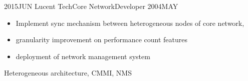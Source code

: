\begin{experiences}
	\emptySeparator
	\experience
	{2015JUN} {Lucent Tech}{Core Network}{Developer}
	{2004MAY}    {
		\begin{itemize}
			\item Implement sync mechanism between heterogeneous nodes of core network, 
			\item granularity improvement on performance count features
			\item deployment of network management system
		\end{itemize}
	}
	{Heterogeneous architecture, CMMI, NMS} 
	\emptySeparator
\end{experiences}
